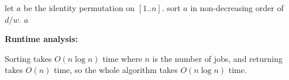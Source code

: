 \documentclass[answers]{exam}
\newenvironment{answer}{%
     \renewcommand{\solutiontitle}{\noindent\textbf{Answer:}\enspace}
     \begin{solution}
     }{%
     \end{solution}
     \renewcommand{\solutiontitle}{\noindent\textbf{Solution:}\enspace}
 }
\begin{document}
\begin{questions}
\begin{parts}
\begin{answer}
        \begin{algorithmic}
                \State let $a$ be the identity permutation on $[1..n]$.
                \State sort $a$ in non-decreasing order of $d/w$.
                \State \Return $a$
            \EndFunction
        \end{algorithmic}

        \textbf{Runtime analysis:}

        Sorting takes $O(n \log n)$ time where $n$ is the number of jobs, and returning takes $O(n)$ time, so the whole algorithm takes $O(n \log n)$ time.
    \end{answer}

\end{parts}

\end{questions}
\end{document}
